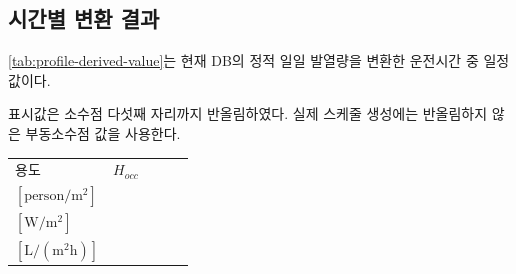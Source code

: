 \subsection{시간별 변환 결과}

\cref{tab:profile-derived-value}는
현재 DB의 정적 일일 발열량을 변환한 운전시간 중 일정값이다.

표시값은 소수점 다섯째 자리까지 반올림하였다. 실제 스케줄 생성에는
반올림하지 않은 부동소수점 값을 사용한다.

\begin{defaulttable}
  \caption{현재 내장 프로필의 시간별 변환 결과}
  \label{tab:profile-derived-value}
  {\small
  \renewcommand{\arraystretch}{1.08}
  \begin{tabularx}{\textwidth}{Xrrrr}
    \toprule
    용도
      & $H_{occ}$
      & \makecell[r]{$n_{occ}$\\$[\mathrm{person/m^2}]$}
      & \makecell[r]{$p_{equip}$\\$[\mathrm{W/m^2}]$}
      & \makecell[r]{$v_{dhw}$\\$[\mathrm{L/(m^2h)}]$} \\ \midrule


\end{tabularx}}
\end{defaulttable}
